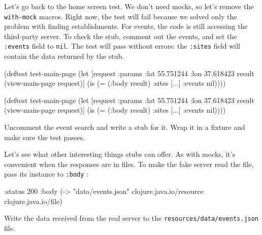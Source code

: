 \fi

Let's go back to the home screen test. We don't need mocks, so let's remove the \verb|with-mock| macros. Right now, the test will fail because we solved only the problem with finding establishments. For events, the code is still accessing the third-party server. To check the stub, comment out the events, and set the \verb|:events| field to \verb|nil|. The test will pass without errors: the \verb|:sites| field will contain the data returned by the stub.

\ifx\DEVICETYPE\MOBILE

\begin{english}
  \begin{clojure}
(deftest test-main-page
  (let [request
        {:params {:lat 55.751244
                  :lon 37.618423}}
        result (view-main-page request)]
    (is (= (:body result)
           {:sites [...] :events nil}))))
  \end{clojure}
\end{english}

\else

\begin{english}
  \begin{clojure}
(deftest test-main-page
  (let [request {:params {:lat 55.751244
                          :lon 37.618423}}
        result (view-main-page request)]
    (is (= (:body result) {:sites [...] :events nil}))))
  \end{clojure}
\end{english}

\fi

Uncomment the event search and write a stub for it. Wrap it in a fixture and make sure the test passes.

Let's see what other interesting things stubs can offer. As with mocks, it's convenient when the responses are in files. To make the fake server read the file, pass its instance to \verb|:body| :


\begin{english}
  \begin{clojure}
{:status 200
 :body (-> "data/events.json"
           clojure.java.io/resource
           clojure.java.io/file)}
  \end{clojure}
\end{english}

\noindent
Write the data received from the real server to the \verb|resources/data/events.json| file.

